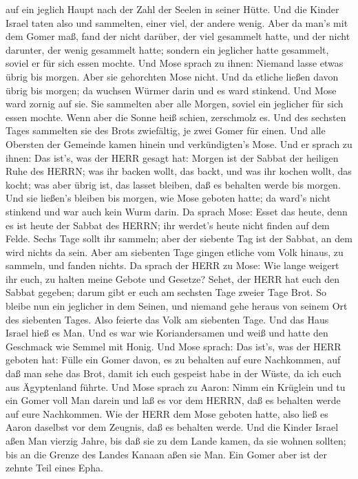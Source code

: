 auf ein jeglich Haupt nach der Zahl der Seelen in seiner Hütte.
 Und die Kinder Israel taten also und sammelten, einer
viel, der andere wenig.  Aber da man's mit dem Gomer maß,
fand der nicht darüber, der viel gesammelt hatte, und der nicht
darunter, der wenig gesammelt hatte; sondern ein jeglicher hatte
gesammelt, soviel er für sich essen mochte.  Und Mose
sprach zu ihnen: Niemand lasse etwas übrig bis morgen. 
Aber sie gehorchten Mose nicht. Und da etliche ließen davon übrig bis
morgen; da wuchsen Würmer darin und es ward stinkend. Und Mose ward
zornig auf sie.  Sie sammelten aber alle Morgen, soviel ein
jeglicher für sich essen mochte. Wenn aber die Sonne heiß schien,
zerschmolz es.  Und des sechsten Tages sammelten sie des
Brots zwiefältig, je zwei Gomer für einen. Und alle Obersten der
Gemeinde kamen hinein und verkündigten's Mose.  Und er
sprach zu ihnen: Das ist's, was der HERR gesagt hat: Morgen ist der
Sabbat der heiligen Ruhe des HERRN; was ihr backen wollt, das backt, und
was ihr kochen wollt, das kocht; was aber übrig ist, das lasset bleiben,
daß es behalten werde bis morgen.  Und sie ließen's bleiben
bis morgen, wie Mose geboten hatte; da ward's nicht stinkend und war
auch kein Wurm darin.  Da sprach Mose: Esset das heute,
denn es ist heute der Sabbat des HERRN; ihr werdet's heute nicht finden
auf dem Felde.  Sechs Tage sollt ihr sammeln; aber der
siebente Tag ist der Sabbat, an dem wird nichts da sein. 
Aber am siebenten Tage gingen etliche vom Volk hinaus, zu sammeln, und
fanden nichts.  Da sprach der HERR zu Mose: Wie lange
weigert ihr euch, zu halten meine Gebote und Gesetze? 
Sehet, der HERR hat euch den Sabbat gegeben; darum gibt er euch am
sechsten Tage zweier Tage Brot. So bleibe nun ein jeglicher in dem
Seinen, und niemand gehe heraus von seinem Ort des siebenten Tages.
 Also feierte das Volk am siebenten Tage.  Und
das Haus Israel hieß es Man. Und es war wie Koriandersamen und weiß und
hatte den Geschmack wie Semmel mit Honig.  Und Mose sprach:
Das ist's, was der HERR geboten hat: Fülle ein Gomer davon, es zu
behalten auf eure Nachkommen, auf daß man sehe das Brot, damit ich euch
gespeist habe in der Wüste, da ich euch aus Ägyptenland führte.
 Und Mose sprach zu Aaron: Nimm ein Krüglein und tu ein
Gomer voll Man darein und laß es vor dem HERRN, daß es behalten werde
auf eure Nachkommen.  Wie der HERR dem Mose geboten hatte,
also ließ es Aaron daselbst vor dem Zeugnis, daß es behalten werde.
 Und die Kinder Israel aßen Man vierzig Jahre, bis daß sie
zu dem Lande kamen, da sie wohnen sollten; bis an die Grenze des Landes
Kanaan aßen sie Man.  Ein Gomer aber ist der zehnte Teil
eines Epha.

